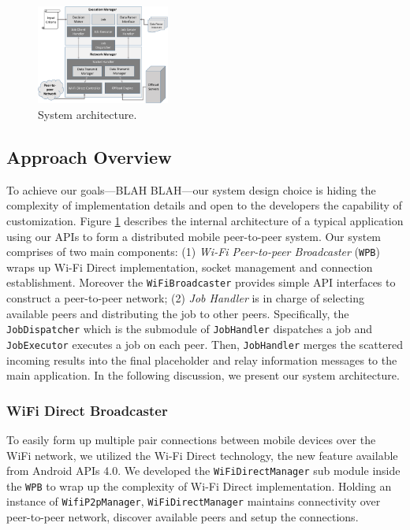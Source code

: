 \documentclass[conference]{IEEEtran}
\begin{document}
\begin{figure} 
\centerline {
\includegraphics[width=0.39\textwidth, natwidth=643, natheight=559]{data/jobShareArch}
}
\caption{System architecture.}
\label{fig:architecture}
\end{figure}

\subsection{Approach Overview}
To achieve our goals---BLAH BLAH---our system design choice is hiding the complexity of implementation details and open to the developers the capability of customization. Figure \ref{fig:architecture} describes the internal architecture of a typical application using our APIs to form a distributed mobile peer-to-peer system. Our system comprises of two main components: (1) \emph{Wi-Fi Peer-to-peer Broadcaster} (\texttt{WPB}) wraps up Wi-Fi Direct implementation, socket management and connection establishment. Moreover the \texttt{WiFiBroadcaster} provides simple API interfaces to construct a peer-to-peer network; (2) \emph{Job Handler} is in charge of selecting available peers and distributing the job to other peers. Specifically, the \texttt{JobDispatcher} which is the submodule of \texttt{JobHandler} dispatches a job and \texttt{JobExecutor} executes a job on each peer. Then, \texttt{JobHandler} merges the scattered incoming results into the final placeholder and relay information messages to the main application. In the following discussion, we present our system architecture.


\subsubsection{WiFi Direct Broadcaster}
To easily form up multiple pair connections between mobile devices over the WiFi network, we utilized the Wi-Fi Direct technology, the new feature available from Android APIs 4.0. We developed the \texttt{WiFiDirectManager} sub module inside the \texttt{WPB} to wrap up the complexity of Wi-Fi Direct implementation. Holding an instance of \texttt{WifiP2pManager}, \texttt{WiFiDirectManager} maintains connectivity over peer-to-peer network, discover available peers and setup the connections. 
\end{document}
